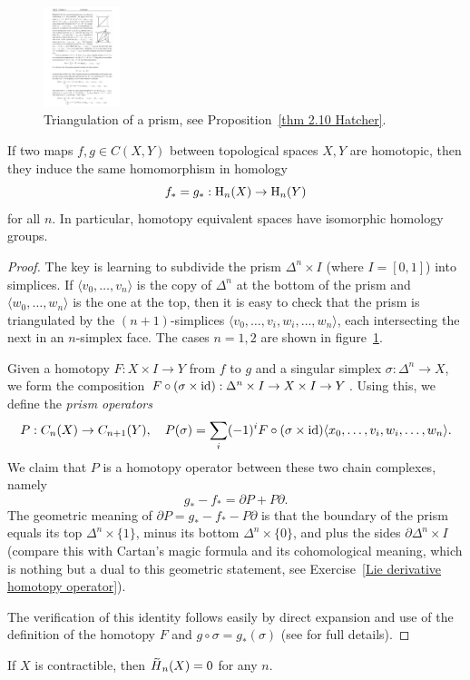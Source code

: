 \begin{figure}[tp]
    \begin{center}
        \includegraphics[width=0.2\textwidth]{figures/prism.pdf}
    \end{center}
    \caption{Triangulation of a prism, see Proposition~\ref{thm 2.10 Hatcher}.\label{Prism fig}}
\end{figure}
\begin{prop}\label{thm 2.10 Hatcher}
    If two maps $f,g\in C(X,Y)$ between topological spaces $X,Y$ are homotopic, then they induce the same homomorphism in homology
    \[f_\ast=g_\ast :\mathrm{H}_n(X)\to \mathrm{H}_n(Y)\]
    for all $n$. In particular, homotopy equivalent spaces have isomorphic homology groups.
\end{prop}
\begin{proof}
     The key is learning to subdivide the prism $\Delta^n\times I$ (where $I=[0,1]$) into simplices. If $\langle v_0,\ldots,v_n\rangle$ is the copy of $\Delta^n$ at the bottom of the prism and $\langle w_0,\ldots,w_n\rangle$ is the one at the top, then it is easy to check that the prism is triangulated by the $(n+1)$-simplices $\langle v_0,\ldots,v_i,w_i,\ldots,w_n\rangle$, each intersecting the next in an $n$-simplex face. The cases $n=1,2$ are shown in figure~\ref{Prism fig}.
     
     Given a homotopy $F:X\times I\to Y$ from $f$ to $g$ and a singular simplex $\sigma:\Delta^n\to X$, we form the composition $F\circ(\sigma\times \operatorname{id}):\Delta^n\times I\to X\times I\to Y$. Using this, we define the \emph{prism operators}
     \[P:C_n(X)\to C_{n+1}(Y),\quad P(\sigma)=\sum_i(-1)^i F\circ (\sigma\times\operatorname{id})\langle x_0,\ldots,v_i,w_i,\ldots,w_n\rangle.\]
     We claim that $P$ is a homotopy operator between these two chain complexes, namely
     \[g_\ast-f_\ast=\partial P+P\partial.\]
     The geometric meaning of $\partial P=g_\ast-f_\ast-P\partial$ is that the boundary of the prism equals its top $\Delta^n\times\{1\}$, minus its bottom $\Delta^n\times\{0\}$, and plus the sides $\partial\Delta^n\times I$ (compare this with Cartan's magic formula and its cohomological meaning, which is nothing but a dual to this geometric statement, see Exercise~\ref{Lie derivative homotopy operator}).
     
     The verification of this identity follows easily by direct expansion and use of the definition of the homotopy $F$ and $g\circ\sigma=g_\ast(\sigma)$ (see \cite[Thm.~2.10]{Hatcher} for full details).
\end{proof}
\begin{cor}
    If $X$ is contractible, then $\wt{H}_n(X)=0$ for any $n$.
\end{cor}


